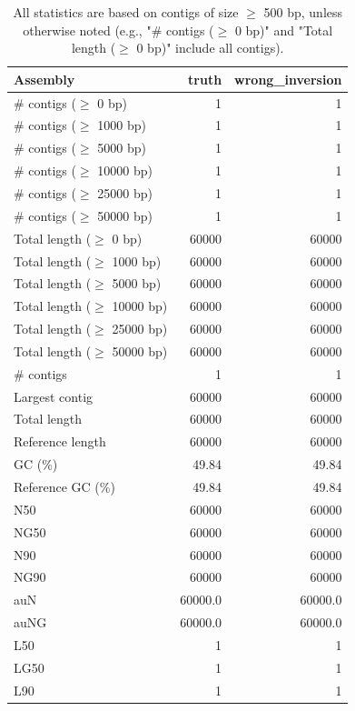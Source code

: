 \documentclass[12pt,a4paper]{article}
\begin{document}
\begin{table}[ht]
\begin{center}
\caption{All statistics are based on contigs of size $\geq$ 500 bp, unless otherwise noted (e.g., "\# contigs ($\geq$ 0 bp)" and "Total length ($\geq$ 0 bp)" include all contigs).}
\begin{tabular}{|l*{2}{|r}|}
\hline
Assembly & truth & wrong\_inversion \\ \hline
\# contigs ($\geq$ 0 bp) & 1 & 1 \\ \hline
\# contigs ($\geq$ 1000 bp) & 1 & 1 \\ \hline
\# contigs ($\geq$ 5000 bp) & 1 & 1 \\ \hline
\# contigs ($\geq$ 10000 bp) & 1 & 1 \\ \hline
\# contigs ($\geq$ 25000 bp) & 1 & 1 \\ \hline
\# contigs ($\geq$ 50000 bp) & 1 & 1 \\ \hline
Total length ($\geq$ 0 bp) & 60000 & 60000 \\ \hline
Total length ($\geq$ 1000 bp) & 60000 & 60000 \\ \hline
Total length ($\geq$ 5000 bp) & 60000 & 60000 \\ \hline
Total length ($\geq$ 10000 bp) & 60000 & 60000 \\ \hline
Total length ($\geq$ 25000 bp) & 60000 & 60000 \\ \hline
Total length ($\geq$ 50000 bp) & 60000 & 60000 \\ \hline
\# contigs & 1 & 1 \\ \hline
Largest contig & 60000 & 60000 \\ \hline
Total length & 60000 & 60000 \\ \hline
Reference length & 60000 & 60000 \\ \hline
GC (\%) & 49.84 & 49.84 \\ \hline
Reference GC (\%) & 49.84 & 49.84 \\ \hline
N50 & 60000 & 60000 \\ \hline
NG50 & 60000 & 60000 \\ \hline
N90 & 60000 & 60000 \\ \hline
NG90 & 60000 & 60000 \\ \hline
auN & 60000.0 & 60000.0 \\ \hline
auNG & 60000.0 & 60000.0 \\ \hline
L50 & 1 & 1 \\ \hline
LG50 & 1 & 1 \\ \hline
L90 & 1 & 1 \\ \hline

\end{tabular}
\end{center}
\end{table}
\end{document}
